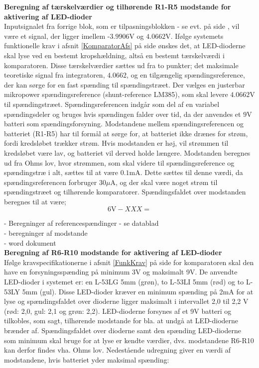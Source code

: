\noindent\textbf{Beregning af tærskelværdier og tilhørende R1-R5 modstande for aktivering af LED-dioder} \\
Inputsignalet fra forrige blok, som er tilpasningsblokken - se evt.  på side \pageref{ref:blokdiagram}, vil være et signal, der ligger imellem -$3.9906$V og $4.0662$V. Ifølge systemets funktionelle krav i afsnit \ref{KomparatorAfs} på side \pageref{KomparatorAfs} ønskes det, at LED-dioderne skal lyse ved en bestemt kropshældning, altså en bestemt tærskelværdi i komparatoren. Disse tærskelværdier sættes ud fra to punkter; det maksimale teoretiske signal fra integratoren, $4.0662$, og en tilgængelig spændingsreference, der kan sørge for en fast spænding til spændingstræet. Der vælges en justerbar mikropower spændingsreference (shunt-reference LM385), som skal levere $4.0662$V til spændingstræet. Spændingsreferencen indgår som del af en variabel spændingsdeler og bruges hvis spændingen falder over tid, da der anvendes et $9$V batteri som spændingsforsyning. Modstandene mellem spændingsreferencen og batteriet (R1-R5) har til formål at sørge for, at batteriet ikke drænes for strøm, fordi kredsløbet trækker strøm. Hvis modstanden er høj, vil strømmen til kredsløbet være lav, og batteriet vil derved holde længere. Modstanden beregnes ud fra Ohms lov, hvor strømmen, som skal videre til spændingsreference og spændingstræ i alt, sættes til at være $0.1$mA. Dette sættes til denne værdi, da spændingsreferencen forbruger $30\mu$A, og der skal være noget strøm til spændingstræet og tilhørende komparatorer. Spændingsfaldet over modstanden beregnes til at være;
\begin{equation}
6\text{V} - XXX  =   
\end{equation}

- Beregninger af referencespændinger - se datablad \\
- beregninger af modstande \\
- word dokument \\

\noindent\textbf{Beregning af R6-R10 modstande for aktivering af LED-dioder} \\
Ifølge kravspecifikationerne i afsnit \ref{FunkKrav}  på side \pageref{FunkKrav} for komparatoren skal den have en forsyningsspænding på minimum 3V og maksimalt 9V. De anvendte LED-dioder i systemet er: en L-53LG 5mm (grøn), to L-53LI 5mm (rød) og to L-53LY 5mm (gul). Disse LED-dioder kræver en minimum spænding på 2mA for at lyse og spændingsfaldet over dioderne ligger maksimalt i intervallet 2,0 til 2,2 V (rød: 2,0, gul: 2,1 og grøn: 2,2). LED-dioderne forsynes af et 9V batteri og tilkobles, som sagt, tilhørende modstande for bla. at undgå at LED-dioderne brænder af. Spændingsfaldet over dioderne samt den spænding LED-dioderne som minimum skal bruge for at lyse er kendte værdier, dvs. modstandene R6-R10 kan derfor findes vha. Ohms lov. Nedestående udregning giver en værdi af modstandene, hvis batteriet yder maksimal spænding: \\

